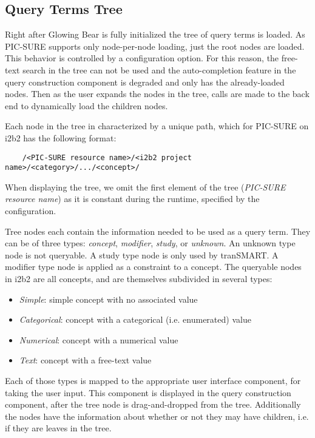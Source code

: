 
\subsection{Query Terms Tree}
\label{sec:design-tree}

Right after Glowing Bear is fully initialized the tree of query terms is loaded.
As PIC-SURE supports only node-per-node loading, just the root nodes are loaded. 
This behavior is controlled by a configuration option.
For this reason, the free-text search in the tree can not be used and the auto-completion feature in the query construction component is degraded and only has the already-loaded nodes.
Then as the user expands the nodes in the tree, calls are made to the back end to dynamically load the children nodes.

Each node in the tree in characterized by a unique path, which for PIC-SURE on i2b2 has the following format:
\begin{verbatim}
    /<PIC-SURE resource name>/<i2b2 project name>/<category>/.../<concept>/
\end{verbatim}
When displaying the tree, we omit the first element of the tree (\emph{PIC-SURE resource name}) as it is constant during the runtime, specified by the configuration.

Tree nodes each contain the information needed to be used as a query term.
They can be of three types: \emph{concept}, \emph{modifier}, \emph{study}, or \emph{unknown}.
An unknown type node is not queryable. 
A study type node is only used by tranSMART.
A modifier type node is applied as a constraint to a concept.
The queryable nodes in i2b2 are all concepts, and are themselves subdivided in several types:
\begin{itemize}
    \setlength\itemsep{0em}
    \item \emph{Simple}: simple concept with no associated value
    \item \emph{Categorical}: concept with a categorical (i.e. enumerated) value
    \item \emph{Numerical}: concept with a numerical value
    \item \emph{Text}: concept with a free-text value
\end{itemize}
Each of those types is mapped to the appropriate user interface component, for taking the user input.
This component is displayed in the query construction component, after the tree node is drag-and-dropped from the tree.
Additionally the nodes have the information about whether or not they may have children, i.e. if they are leaves in the tree.


